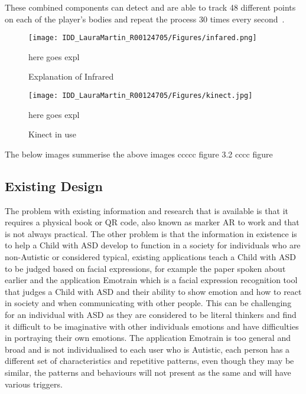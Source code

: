 These combined components can detect and are able to track 48 different points on each of the player's bodies and repeat the process 30 times every second~\cite{Reference27}.


\begin{figure}[h]
\centering
\texttt{[image: IDD\_LauraMartin\_R00124705/Figures/infared.png]}
\caption{Explanation of Infrared}
{here goes expl}
\end{figure}



\begin{figure}[h]
\centering
\texttt{[image: IDD\_LauraMartin\_R00124705/Figures/kinect.jpg]}
\caption{Kinect in use}
{here goes expl}
\end{figure}

The below images summerise the above images ccccc
figure 3.2 cccc
figure 

\subsection{Existing Design}
The problem with existing information and research that is available is that it requires a physical book or QR code, also known as marker AR to work and that is not always practical. The other problem is that the information in existence is to help a Child with ASD develop to function in a society for individuals who are non-Autistic or considered typical, existing applications teach a Child with ASD to be judged based on facial expressions, for example the paper spoken about earlier and the application Emotrain which is a facial expression recognition tool that judges a Child with ASD and their ability to show emotion and how to react in society and when communicating with other people. This can be challenging for an individual with ASD as they are considered to be literal thinkers and find it difficult to be imaginative with other individuals emotions and have difficulties in portraying their own emotions. The application Emotrain is too general and broad and is not individualised to each user who is Autistic, each person has a different set of characteristics and repetitive patterns, even though they may be similar, the patterns and behaviours will not present as the same and will have various triggers. 

